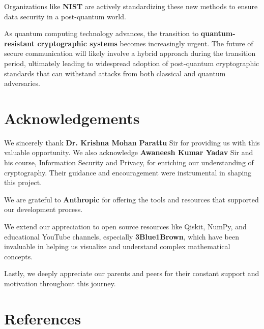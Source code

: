 \documentclass{article}
\begin{document}
Organizations like \textbf{NIST} are actively standardizing these new methods to ensure data security in a post-quantum world.

As quantum computing technology advances, the transition to \textbf{quantum-resistant cryptographic systems} becomes increasingly urgent. The future of secure communication will likely involve a hybrid approach during the transition period, ultimately leading to widespread adoption of post-quantum cryptographic standards that can withstand attacks from both classical and quantum adversaries.

\newpage
\section{Acknowledgements}

We sincerely thank \textbf{Dr. Krishna Mohan Parattu} Sir for providing us with this valuable opportunity. We also acknowledge \textbf{Awaneesh Kumar Yadav} Sir and his course, Information Security and Privacy, for enriching our understanding of cryptography. Their guidance and encouragement were instrumental in shaping this project.

We are grateful to \textbf{Anthropic} for offering the tools and resources that supported our development process.

We extend our appreciation to open source resources like Qiskit, NumPy, and educational YouTube channels, especially \textbf{3Blue1Brown}, which have been invaluable in helping us visualize and understand complex mathematical concepts.

Lastly, we deeply appreciate our parents and peers for their constant support and motivation throughout this journey.

\newpage
\section{References}
\end{document}
